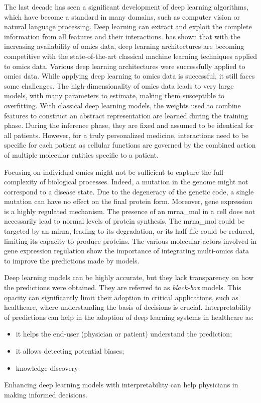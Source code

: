 \documentclass[../main.tex]{subfiles}
\begin{document}
 The last decade has seen a significant development of deep learning algorithms, which have become a standard in many domains, such as computer vision or natural language processing.
 Deep learning can extract and exploit the complete information from all features and their interactions.
 \citeauthor{Hanczar2022} has shown that with the increasing availability of omics data, deep learning architectures are becoming competitive with the state-of-the-art classical machine learning techniques applied to omics data.
 Various deep learning architectures were successfully applied to omics data.
 While applying deep learning to omics data is successful, it still faces some challenges.
 The high-dimensionality of omics data leads to very large models, \ie{}with many parameters to estimate, making them susceptible to overfitting.
 With classical deep learning models, the weights used to combine features to construct an abstract representation are learned during the training phase.
 During the inference phase, they are fixed and assumed to be identical for all patients.
 However, for a truly personalized medicine, interactions need to be specific for each patient as cellular functions are governed by the combined action of multiple molecular entities specific to a patient.

 Focusing on individual omics might not be sufficient to capture the full complexity of biological processes.
 Indeed, a mutation in the genome might not correspond to a disease state.
 Due to the degeneracy of the genetic code, a single mutation can have no effect on the final protein form.
 Moreover, gene expression is a highly regulated mechanism.
 The presence of an \gls{mrna_mol} in a cell does not necessarily lead to normal levels of protein synthesis.
 The \gls{mrna_mol} could be targeted by an \gls{mirna}, leading to its degradation, or its half-life could be reduced, limiting its capacity to produce proteins.
 The various molecular actors involved in gene expression regulation show the importance of integrating multi-omics data to improve the predictions made by models.

 Deep learning models can be highly accurate, but they lack transparency on how the predictions were obtained. 
 They are referred to as \textit{black-box} models. 
 This opacity can significantly limit their adoption in critical applications, such as healthcare,  where understanding the basis of decisions is crucial. 
 Interpretability of predictions can help in the adoption of deep learning systems in healthcare as:
 \begin{itemize}[nosep]
    \item it helps the end-user (physician or patient) understand the prediction;
    \item it allows detecting potential biases;
    \item knowledge discovery
 \end{itemize}
Enhancing deep learning models with interpretability can help physicians in making informed decisions.
\end{document}
